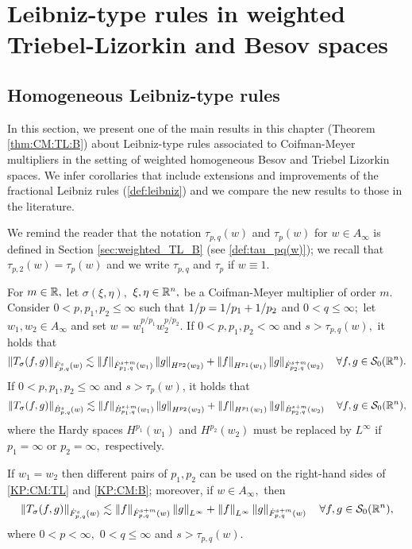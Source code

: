  \section{Leibniz-type rules in weighted Triebel-Lizorkin and Besov spaces}\label{sec:ch2_results}
 
 \subsection{Homogeneous Leibniz-type rules}\label{sec:homogeneous_rules}
 
 In this section, we present one of the main results in this chapter (Theorem \ref{thm:CM:TL:B}) about Leibniz-type rules associated to Coifman-Meyer multipliers in the setting of weighted homogeneous Besov and Triebel Lizorkin spaces. We infer corollaries that include extensions and improvements of the fractional Leibniz rules (\ref{def:leibniz}) and we compare the new results to those in the literature. 
 
 We remind the reader that the notation $\tau_{p,q}(w)$ and $\tau_p (w)$ for $w\in A_\infty$ is defined in Section \ref{sec:weighted_TL_B} (see \ref{def:tau_pq(w)}); we recall that $\tau_{p,2}(w) = \tau_p(w)$ and we write $\tau_{p,q}$ and $\tau_p$ if $w\equiv 1$. 
  
  \begin{theorem}\label{thm:CM:TL:B}  For $m \in \re,$ let $\sigma(\xi,\eta),$ $\xi,\eta\in\rn,$ be a Coifman-Meyer multiplier of order $m.$ Consider  $0 < p, p_1, p_2  \le \infty$  such that $\hcline$ and  $0 < q \leq \infty;$ let  $w_1,w_2\in A_\infty$ and set $w=w_1^{{p}/{p_1}} w_2^{{p}/{p_2}}.$ 
If $0 < p,p_1,p_2 < \infty$ and  $s > \tau_{p,q}(w),$  it holds that
\begin{equation}\label{KP:CM:TL}
\norm{T_\sigma(f,g)}{\tlw{p}{s}{q}{w}} \lesssim \norm{f}{\tlw{p_1}{s+m}{q}{w_1} } \norm{g}{H^{p_2}(w_2)} +  \norm{f}{H^{p_1}(w_1)}   \norm{g}{\tlw{p_2}{s+m}{q}{w_2} } \quad \forall f, g \in \swz.
\end{equation}
If $0< p, p_1,p_2\leq \infty$ and $s > \tau_p(w)$, it holds that
\begin{equation}\label{KP:CM:B}
\norm{T_\sigma(f,g)}{\besw{p}{s}{q}{w}} \lesssim \norm{f}{\besw{p_1}{s+m}{q}{w_1} } \norm{g}{H^{p_2}(w_2)} +  \norm{f}{H^{p_1}(w_1)}   \norm{g}{\besw{p_2}{s+m}{q}{w_2} } \quad \forall f, g \in \swz,
\end{equation}
where the Hardy spaces $H^{p_1}(w_1)$ and $H^{p_2}(w_2)$ must be replaced by $L^\infty$ if $p_1=\infty$ or $p_2=\infty,$ respectively.

If $w_1=w_2$ then different pairs of $p_1, p_2$ can be used on the right-hand sides of \eqref{KP:CM:TL} and \eqref{KP:CM:B}; moreover, if $w\in A_\infty,$ then 
\begin{equation}\label{KP:CM:TL2}
\norm{T_\sigma(f,g)}{\tlw{p}{s}{q}{w}} \lesssim \norm{f}{\tlw{p}{s+m}{q}{w} } \norm{g}{L^\infty} +  \norm{f}{L^\infty}   \norm{g}{\tlw{p}{s+m}{q}{w}} \quad \forall f, g \in \swz,
\end{equation}
where $0<p<\infty,$ $0<q\le\infty$ and $s>\tau_{p,q}(w).$
\end{theorem}


